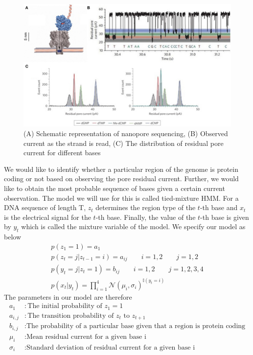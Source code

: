 \documentclass[11pt]{article}
\begin{document}
\begin{figure}[h]
    \centering
    \includegraphics[width=1.0\textwidth]{nanopore.jpg}
    \caption{(A) Schematic representation of nanopore sequencing, (B) Observed current as the strand is read, (C) The distribution of residual pore current for different bases}
    \label{Fig 2}
\end{figure}
\newline
\newline
We would like to identify whether a particular region of the genome is protein coding or not based on observing the pore residual current. Further, we would like to obtain the most probable sequence of bases given a certain current observation. The model we will use for this is called tied-mixture HMM. 
\newline
\newline
For a DNA sequence of length T, $z_t$ determines the region type of the $t$-th base and $x_t$ is the electrical signal for the $t$-th base. Finally, the value of the $t$-th base is given by $y_t$ which is called the mixture variable of the model. We specify our model as below 
\begin{align}
    p(z_1 = 1) = a_1 \\
    p(z_t = j | z_{t-1} = i) = a_{ij} \qquad i = 1, 2 \qquad j = 1, 2\\
    p(y_t = j | z_t = 1) = b_{ij} \qquad i = 1, 2 \qquad j = 1, 2, 3, 4\\
    p(x_t | y_t) = \prod_{i = 1}^4 \mathcal{N}(\mu_i, \sigma_i)^{\mathbb{I}(y_t = i)}
\end{align}
The parameters in our model are therefore 
\begin{align*}
    a_1 &: \text{The initial probability of $z_1=1$}\\
    a_{i,j} &: \text{The transition probability of $z_{t}$ to $z_{t +1}$} \\
    b_{i,j} &: \text{The probability of a particular base given that a region is protein coding} \\
    \mu_i &: \text{Mean residual current for a given base i} \\
    \sigma_i &: \text{Standard deviation of residual current for a given base i}
\end{align*}
\end{document}
